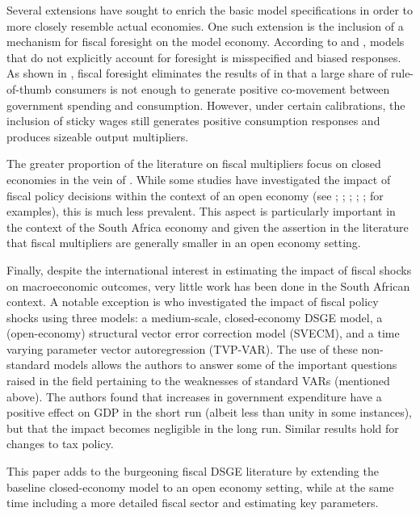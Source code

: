 \documentclass[a4paper,11pt]{article}
\numberwithin{equation}{section}
\begin{document}
	Several extensions have sought to enrich the basic model specifications in order to more closely resemble actual economies. One such extension is the inclusion of a mechanism for fiscal foresight on the model economy. According to \cite{ramey2011b} and \cite{leeper2012}, models that do not explicitly account for foresight is misspecified and biased responses. As shown in \cite{jooste2017}, fiscal foresight eliminates the results of \cite{gali} in that a large share of rule-of-thumb consumers is not enough to generate positive co-movement between government spending and consumption. However, under certain calibrations, the inclusion of sticky wages still generates positive consumption responses and produces sizeable output multipliers. 
	
	The greater proportion of the literature on fiscal multipliers focus on closed economies in the vein of \cite{gali}. While some studies have investigated the impact of fiscal policy decisions within the context of an open economy (see \citealp{erceg2006}; \citealp{cavallo2007}; \citealp{ratto2007}; \citealp{levine2009}; \citealp{horvath2014}; \citealp{petros2019} for examples), this is much less prevalent. This aspect is particularly important in the context of the South Africa economy and given the assertion in the literature that fiscal multipliers are generally smaller in an open economy setting.
	
	Finally, despite the international interest in estimating the impact of fiscal shocks on macroeconomic outcomes, very little work has been done in the South African context. A notable exception is \cite{jooste} who investigated the impact of fiscal policy shocks using three models: a medium-scale, closed-economy DSGE model, a (open-economy) structural vector error correction model (SVECM), and a time varying parameter vector autoregression (TVP-VAR). The use of these non-standard models allows the authors to answer some of the important questions raised in the field pertaining to the weaknesses of standard VARs (mentioned above). The authors found that increases in government expenditure have a positive effect on GDP in the short run (albeit less than unity in some instances), but that the impact becomes negligible in the long run. Similar results hold for changes to tax policy.
	
	This paper adds to the burgeoning fiscal DSGE literature by extending the baseline closed-economy model to an open economy setting, while at the same time including a more detailed fiscal sector and estimating key parameters. 
	
\end{document}
